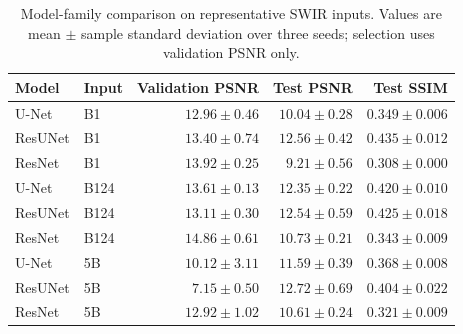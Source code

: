 \begin{table}[htbp]
\centering
\caption{Model-family comparison on representative SWIR inputs. Values are mean $\pm$ sample standard deviation over three seeds; selection uses validation PSNR only.}
\label{tab:model-results}
\small
\begin{tabular}{llrrr}
\toprule
Model & Input & Validation PSNR & Test PSNR & Test SSIM \\
\midrule
U-Net & B1 & $12.96\pm0.46$ & $10.04\pm0.28$ & $0.349\pm0.006$ \\
ResUNet & B1 & $13.40\pm0.74$ & $12.56\pm0.42$ & $0.435\pm0.012$ \\
ResNet & B1 & $13.92\pm0.25$ & $9.21\pm0.56$ & $0.308\pm0.000$ \\
U-Net & B124 & $13.61\pm0.13$ & $12.35\pm0.22$ & $0.420\pm0.010$ \\
ResUNet & B124 & $13.11\pm0.30$ & $12.54\pm0.59$ & $0.425\pm0.018$ \\
ResNet & B124 & $14.86\pm0.61$ & $10.73\pm0.21$ & $0.343\pm0.009$ \\
U-Net & 5B & $10.12\pm3.11$ & $11.59\pm0.39$ & $0.368\pm0.008$ \\
ResUNet & 5B & $7.15\pm0.50$ & $12.72\pm0.69$ & $0.404\pm0.022$ \\
ResNet & 5B & $12.92\pm1.02$ & $10.61\pm0.24$ & $0.321\pm0.009$ \\
\bottomrule
\end{tabular}
\end{table}
